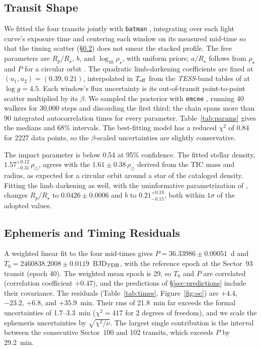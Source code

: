 \documentclass[twocolumn,linenumbers]{aastex701}
\newcommand{\tess}{\textit{TESS}}
\begin{document}
\subsection{Transit Shape} \label{sec:fit}

We fitted the four transits jointly with \texttt{batman} \citep{Kreidberg2015}, integrating over each light curve's exposure time and centering each window on its measured mid-time so that the timing scatter (\S\ref{sec:ttv}) does not smear the stacked profile. The free parameters are $R_p/R_\star$, $b$, and $\log_{10}\rho_\star$, with uniform priors; $a/R_\star$ follows from $\rho_\star$ and $P$ for a circular orbit \citep{Seager2003}. The quadratic limb-darkening coefficients are fixed at $(u_1, u_2) = (0.39, 0.21)$, interpolated in $T_{\rm eff}$ from the \tess-band tables of \citet{Claret2017} at $\log g = 4.5$. Each window's flux uncertainty is its out-of-transit point-to-point scatter multiplied by its $\beta$. We sampled the posterior with \texttt{emcee} \citep{Goodman2010, ForemanMackey2013}, running 40 walkers for 30,000 steps and discarding the first third; the chain spans more than 90 integrated autocorrelation times for every parameter. Table~\ref{tab:params} gives the medians and 68\% intervals. The best-fitting model has a reduced $\chi^2$ of 0.84 for 2227 data points, so the $\beta$-scaled uncertainties are slightly conservative.

The impact parameter is below 0.54 at 95\% confidence. The fitted stellar density, $1.57^{+0.12}_{-0.31}\,\rho_\odot$, agrees with the $1.61 \pm 0.38\,\rho_\odot$ derived from the TIC mass and radius, as expected for a circular orbit around a star of the cataloged density. Fitting the limb darkening as well, with the uninformative parametrization of \citet{Kipping2013}, changes $R_p/R_\star$ to $0.0426 \pm 0.0006$ and $b$ to $0.21^{+0.19}_{-0.15}$, both within $1\sigma$ of the adopted values.

\subsection{Ephemeris and Timing Residuals} \label{sec:ttv}

A weighted linear fit to the four mid-times gives $P = 36.33986 \pm 0.00051$~d and $T_0 = 2460838.2008 \pm 0.0119$~BJD$_{\rm TDB}$, with the reference epoch at the Sector~93 transit (epoch 40). The weighted mean epoch is 29, so $T_0$ and $P$ are correlated (correlation coefficient $+0.47$), and the predictions of \S\ref{sec:predictions} include their covariance. The residuals (Table~\ref{tab:times}, Figure~\ref{fig:oc}) are $+4.4$, $-23.2$, $+6.8$, and $+35.9$~min. Their rms of 21.8~min far exceeds the formal uncertainties of 1.7--3.3~min ($\chi^2 = 417$ for 2 degrees of freedom), and we scale the ephemeris uncertainties by $\sqrt{\chi^2/\nu}$. The largest single contribution is the interval between the consecutive Sector~100 and 102 transits, which exceeds $P$ by 29.2~min.
\end{document}
